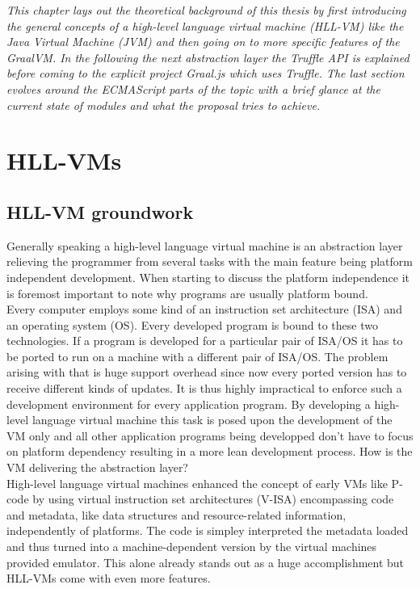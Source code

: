 \emph{This chapter lays out the theoretical background of this thesis by first introducing the general concepts of a high-level language virtual machine (HLL-VM) like the Java Virtual Machine (JVM) and then going on to more specific features of the GraalVM. In the following the next abstraction layer the Truffle API is explained before coming to the explicit project Graal.js which uses Truffle. The last section evolves around the ECMAScript parts of the topic with a brief glance at the current state of modules and what the proposal tries to achieve.}

\section{HLL-VMs}
\subsection{HLL-VM groundwork}
Generally speaking a high-level language virtual machine is an abstraction layer relieving the programmer from several tasks with the main feature being platform independent development. When starting to discuss the platform independence it is foremost important to note why programs are usually platform bound.\\
Every computer employs some kind of an instruction set architecture (ISA) and an operating system (OS). Every developed program is bound to these two technologies. If a program is developed for a particular pair of ISA/OS it has to be ported to run on a machine with a different pair of ISA/OS. The problem arising with that is huge support overhead since now every ported version has to receive different kinds of updates. It is thus highly impractical to enforce such a development environment for every application program. By developing a high-level language virtual machine this task is posed upon the development of the VM only and all other application programs being developped don't have to focus on platform dependency resulting in a more lean development process. How is the VM delivering the abstraction layer?\\
High-level language virtual machines enhanced the concept of early VMs like P-code by using virtual instruction set architectures (V-ISA) encompassing code and metadata, like data structures and resource-related information, independently of platforms. The code is simpley interpreted the metadata loaded and thus turned into a machine-dependent version by the virtual machines provided emulator. This alone already stands out as a huge accomplishment but HLL-VMs come with even more features.\\
